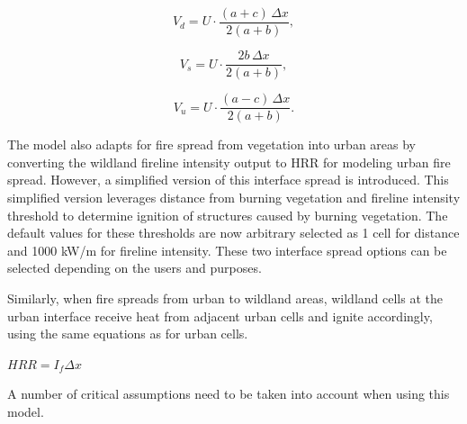 \[
V_d = U \cdot \frac{(a + c)\,\Delta x}{2(a + b)},
\]

\[
V_s = U \cdot \frac{2b\,\Delta x}{2(a + b)},
\]

\[
V_u = U \cdot \frac{(a - c)\,\Delta x}{2(a + b)}.
\]

The model also adapts for fire spread from vegetation into urban areas by converting the wildland fireline intensity output to HRR for modeling urban fire spread. However, a simplified version of this interface spread is introduced. This simplified version leverages distance from burning vegetation and fireline intensity threshold to determine ignition of structures caused by burning vegetation. The default values for these thresholds are now arbitrary selected as 1 cell for distance and 1000 kW/m for fireline intensity. These two interface spread options can be selected depending on the users and purposes.

Similarly, when fire spreads from urban to wildland areas, wildland cells at the urban interface receive heat from adjacent urban cells and ignite accordingly, using the same equations as for urban cells.

$HRR = I_f \Delta x$ 

A number of critical assumptions need to be taken into account when using this model.

